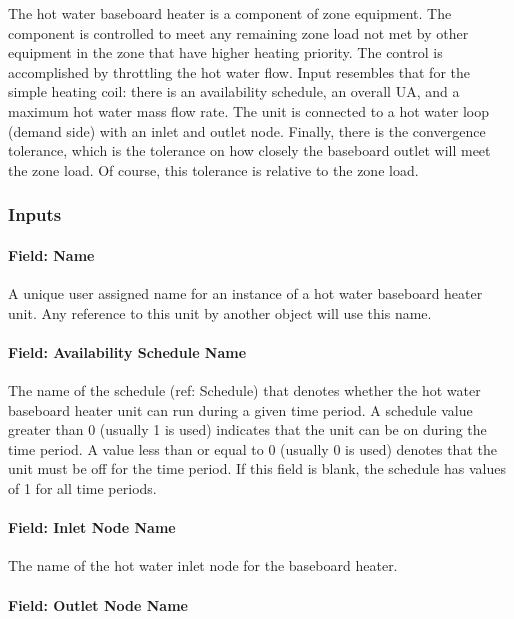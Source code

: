 The hot water baseboard heater is a component of zone equipment. The component is controlled to meet any remaining zone load not met by other equipment in the zone that have higher heating priority. The control is accomplished by throttling the hot water flow. Input resembles that for the simple heating coil: there is an availability schedule, an overall UA, and a maximum hot water mass flow rate. The unit is connected to a hot water loop (demand side) with an inlet and outlet node. Finally, there is the convergence tolerance, which is the tolerance on how closely the baseboard outlet will meet the zone load. Of course, this tolerance is relative to the zone load.

\subsubsection{Inputs}\label{inputs-3-028}

\paragraph{Field: Name}\label{field-name-3-025}

A unique user assigned name for an instance of a hot water baseboard heater unit. Any reference to this unit by another object will use this name.

\paragraph{Field: Availability Schedule Name}\label{field-availability-schedule-name-3-005}

The name of the schedule (ref: Schedule) that denotes whether the hot water baseboard heater unit can run during a given time period. A schedule value greater than 0 (usually 1 is used) indicates that the unit can be on during the time period. A value less than or equal to 0 (usually 0 is used) denotes that the unit must be off for the time period. If this field is blank, the schedule has values of 1 for all time periods.

\paragraph{Field: Inlet Node Name}\label{field-inlet-node-name-2-002}

The name of the hot water inlet node for the baseboard heater.

\paragraph{Field: Outlet Node Name}\label{field-outlet-node-name-2-002}

